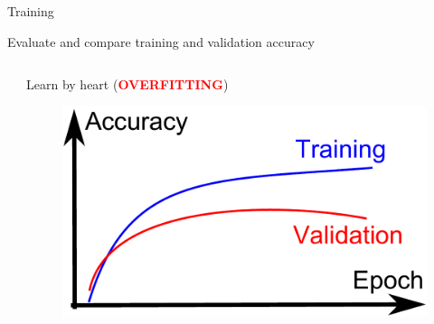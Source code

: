 \begin{frame}
\begin{block}{Training}
\end{block}
\pause
\begin{block}{ Evaluate and compare training and validation accuracy}
\begin{columns}
\begin{column}{.45\textwidth}
\end{column}
\begin{column}{.45\textwidth}
Learn by heart (\textbf{\textcolor{red}{OVERFITTING}})
\begin{figure}
\includegraphics[width=.9\textwidth]{Figures/overfitting.pdf} 
\end{figure}

\end{column}
\end{columns}

\end{block}


\end{frame}


